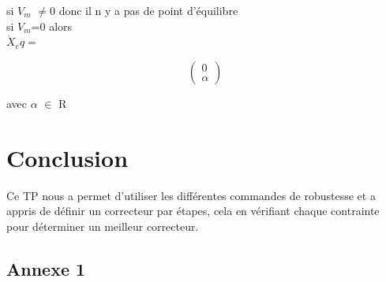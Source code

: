 \documentclass[12pt, a4paper, openany]{report}
\begin{document}
\begin{center}
si $V_m$ $\ne $0 donc il n y a pas de point d'équilibre \\
si $V_m$=0 alors\\
 $\dot{X}_eq=$ \end{center}$$\begin{pmatrix} 0\\\alpha \end{pmatrix}$$
 
 \begin{center}
avec $\alpha$ $\in$ R
\end{center}


\chapter*{Conclusion}

Ce TP nous a permet d'utiliser les différentes commandes de robustesse et a appris de définir un correcteur par étapes, cela en vérifiant chaque contrainte pour déterminer un meilleur correcteur.\\










\begin{appendices}
\chapter*{Annexe 1}
	
				
\end{appendices}





%
%
\end{document}
